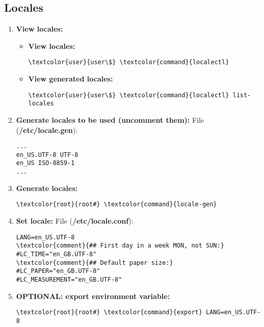 \documentclass[10pt, a4paper, onecolumn, openany]{book} %
\begin{document}
\subsection{Locales}
    \begin{enumerate}
        \item \textbf{View locales:}
        \begin{itemize}
            \item \textbf{View locales:}
\begin{Verbatim}[commandchars=\\\{\}]
\textcolor{user}{user\$} \textcolor{command}{localectl}
\end{Verbatim}            
            \item \textbf{View generated locales:}
\begin{Verbatim}[commandchars=\\\{\}]
\textcolor{user}{user\$} \textcolor{command}{localectl} list-locales
\end{Verbatim}
        \end{itemize}
    
        \item \textbf{Generate locales to be used (uncomment them):}
\newline File (\textbf{\textcolor{file}{/etc/locale.gen}}):
\begin{Verbatim}[commandchars=\\\{\}]
...
en_US.UTF-8 UTF-8
en_US ISO-8859-1
...
\end{Verbatim}
        \item \textbf{Generate locales:}
\begin{Verbatim}[commandchars=\\\{\}]
\textcolor{root}{root#} \textcolor{command}{locale-gen}
\end{Verbatim}      
        \item \textbf{Set locale:}
\newline File (\textbf{\textcolor{file}{/etc/locale.conf}}):
\begin{Verbatim}[commandchars=\\\{\}]
LANG=en_US.UTF-8
\textcolor{comment}{## First day in a week MON, not SUN:}
#LC_TIME="en_GB.UTF-8"
\textcolor{comment}{## Default paper size:}
#LC_PAPER="en_GB.UTF-8"
#LC_MEASUREMENT="en_GB.UTF-8"
\end{Verbatim}
        \item \textbf{OPTIONAL: export environment variable:}
\begin{Verbatim}[commandchars=\\\{\}]
\textcolor{root}{root#} \textcolor{command}{export} LANG=en_US.UTF-8
\end{Verbatim}    
    \end{enumerate}
\end{document}
